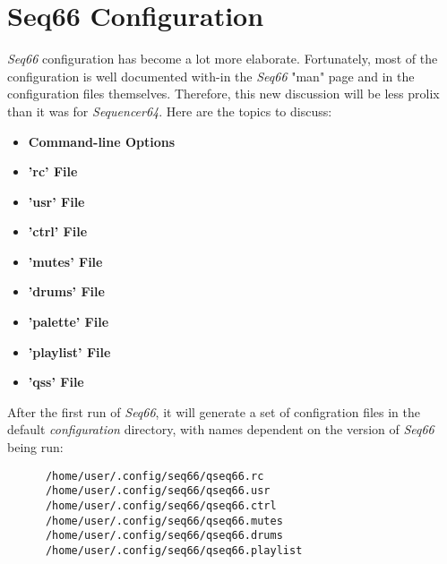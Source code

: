 %
%
%

\section{Seq66 Configuration}
\label{sec:configuration}

   \textsl{Seq66} configuration has become a lot more elaborate.
   Fortunately, most of the configuration is well documented with-in the
   \textsl{Seq66} "man" page and in the configuration files themselves.
   Therefore, this new discussion will be less prolix than it was for
   \textsl{Sequencer64}.  Here are the topics to discuss:

   \begin{itemize}
      \item \textbf{Command-line Options}
      \item \textbf{'rc' File}
      \item \textbf{'usr' File}
      \item \textbf{'ctrl' File}
      \item \textbf{'mutes' File}
      \item \textbf{'drums' File}
      \item \textbf{'palette' File}
      \item \textbf{'playlist' File}
      \item \textbf{'qss' File}
   \end{itemize}

   After the first run of \textsl{Seq66},
   it will generate a set of configration files in the default
   \textsl{configuration} directory, with names dependent on the version of
   \textsl{Seq66} being run:

   \begin{verbatim}
      /home/user/.config/seq66/qseq66.rc
      /home/user/.config/seq66/qseq66.usr
      /home/user/.config/seq66/qseq66.ctrl
      /home/user/.config/seq66/qseq66.mutes
      /home/user/.config/seq66/qseq66.drums
      /home/user/.config/seq66/qseq66.playlist
   \end{verbatim}

